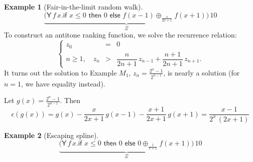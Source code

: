 \documentclass{article}
\newcommand{\tY}{\textsf{Y}}
\newcommand{\tif}[3]{\textsf{if }#1\textsf{ then }#2\textsf{ else }#3}
\theoremstyle{definition}
\newtheorem{example}{Example}
\theoremstyle{lemma}
\theoremstyle{remark}
\begin{document}
\begin{example}[Fair-in-the-limit random walk]
\label{ex:Fair-in-the-limit random walk}\citep[\S 5.3]{DBLP:journals/pacmpl/McIverMKK18}
\[
\underbrace{\big
(\tY \, f \, x . 
\tif{x \leq 0}{0}{f(x - 1) \oplus_{\frac{x}{2x+1}} f(x + 1)} \big)}_{\Xi} 
\, 10
\]
To construct an antitone ranking function, we solve the recurrence relation:
\[
\left\{
\begin{array}{rll}
z_0 &=& 0\\
n \geq 1, \quad z_n &>& \dfrac{n}{2n + 1} \, z_{n-1} + \dfrac{n+1}{2n + 1} \, z_{n+1}.
\end{array}
\right.
\]
It turns out the solution to Example $M_1$, $z_n = \frac{2^n - 1}{2^{n-1}}$, is nearly a solution (for $n = 1$, we have equality instead). 

Let $g(x) = \frac{2^n - 1}{2^{n-1}}$.
Then 
\begin{equation}
\epsilon(g(x)) = 
g(x) - \dfrac{x}{2x + 1} \, g(x-1) - \dfrac{x+1}{2x + 1} \, g(x+1) 
= \dfrac{x-1}{2^{x} \, (2x + 1)}
\label{eqn:in the limit}
\end{equation}


\end{example}

\begin{example}[Escaping spline]
\label{ex:escaping spline}\citep[\S 5.4]{DBLP:journals/pacmpl/McIverMKK18}
\[
\underbrace{\big
(\tY \, f \, x . 
\tif{x \leq 0}{0}{0 \oplus_{\frac{1}{x+1}} f(x + 1)} \big)}_{\Xi} 
\, 10
\]
\end{example}







\end{document}
